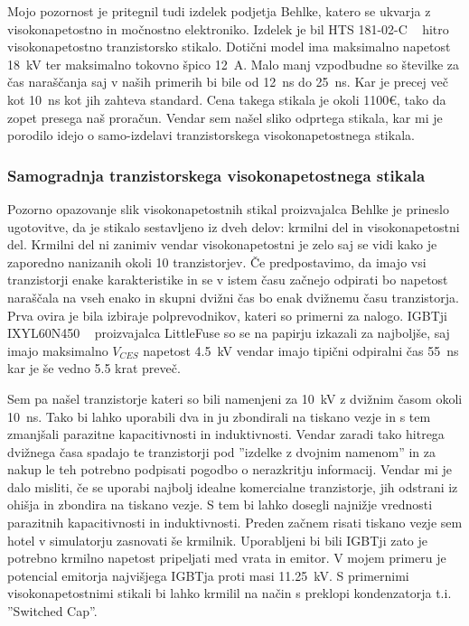 \documentclass[a4paper,twoside,openright,12pt,Slovene]{book}
\begin{document}
	Mojo pozornost je pritegnil tudi izdelek podjetja Behlke, katero se ukvarja z visokonapetostno in močnostno elektroniko. Izdelek je bil HTS 181-02-C ~\cite{Behlke:HTS181-02-C} hitro visokonapetostno tranzistorsko stikalo. Dotični model ima maksimalno napetost \SI{18}{\kilo\volt} ter maksimalno tokovno špico \SI{12}{\ampere}. Malo manj vzpodbudne so številke za čas naraščanja saj v naših primerih bi bile od \SI{12}{\nano\second} do \SI{25}{\nano\second}. Kar je precej več kot \SI{10}{\nano\second} kot jih zahteva standard. Cena takega stikala je okoli 1100\euro , tako da zopet presega naš proračun. Vendar sem našel sliko odprtega stikala, kar mi je porodilo idejo o samo-izdelavi tranzistorskega visokonapetostnega stikala.
	
	\subsubsection{Samogradnja tranzistorskega visokonapetostnega stikala} \label{Samogradnja tranzistorskega visokonapetostnega stikala}
	
	Pozorno opazovanje slik visokonapetostnih stikal proizvajalca Behlke je prineslo ugotovitve, da je stikalo sestavljeno iz dveh delov: krmilni del in visokonapetostni del. Krmilni del ni zanimiv vendar visokonapetostni je zelo saj se vidi kako je zaporedno nanizanih okoli 10 tranzistorjev. Če predpostavimo, da imajo vsi tranzistorji enake karakteristike in se v istem času začnejo odpirati bo napetost naraščala na vseh enako in skupni dvižni čas bo enak dvižnemu času tranzistorja. Prva ovira je bila izbiraje polprevodnikov, kateri so primerni za nalogo. IGBTji IXYL60N450 ~\cite{IXYS:IXYL60N450} proizvajalca LittleFuse so se na papirju izkazali za najboljše, saj imajo maksimalno \(V_{CES}\) napetost \SI{4.5}{\kilo\volt} vendar imajo tipični odpiralni čas \SI{55}{\nano\second} kar je še vedno 5.5 krat preveč. 

    Sem pa našel tranzistorje kateri so bili namenjeni za \SI{10}{\kilo\volt} z dvižnim časom okoli \SI{10}{\nano\second}. Tako bi lahko uporabili dva in ju zbondirali na tiskano vezje in s tem zmanjšali parazitne kapacitivnosti in induktivnosti. Vendar zaradi tako hitrega dvižnega časa spadajo te tranzistorji pod ''izdelke z dvojnim namenom'' in za nakup le teh potrebno podpisati pogodbo o nerazkritju informacij.
Vendar mi je dalo misliti, če se uporabi najbolj idealne komercialne tranzistorje, jih odstrani iz ohišja in zbondira na tiskano vezje. S tem bi lahko dosegli najnižje vrednosti parazitnih kapacitivnosti in induktivnosti. Preden začnem risati tiskano vezje sem hotel v simulatorju zasnovati še krmilnik. Uporabljeni bi bili IGBTji zato je potrebno krmilno napetost pripeljati med vrata in emitor. V mojem primeru je potencial emitorja najvišjega IGBTja proti masi \SI{11.25}{\kilo\volt}. S primernimi visokonapetostnimi stikali bi lahko krmilil na način s preklopi kondenzatorja t.i. ''Switched Cap''.
\end{document}
